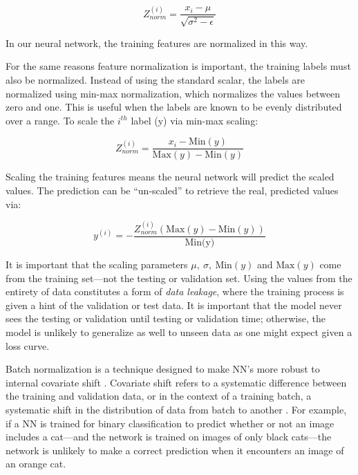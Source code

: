 \begin{equation}
    \label{z-score}
    Z_{norm}^{(i)} = \dfrac{x_i-\mu}{\sqrt{\sigma^2-\epsilon}}
\end{equation}

\noindent In our neural network, the training features are normalized in this way. 

For the same reasons feature normalization is important, the training labels must also be normalized. Instead of using the standard scalar, the labels are normalized using min-max normalization, which normalizes the values between zero and one. This is useful when the labels are known to be evenly distributed over a range. To scale the $ i^{th} $ label (y) via min-max scaling:

\begin{equation}
    Z_{norm}^{(i)} = \dfrac{x_i - \text{Min}(y)}{\text{Max}(y) - \text{Min}(y)}
    \label{eqn:min-max-scaler}
\end{equation}

Scaling the training features means the neural network will predict the scaled values. The prediction can be ``un-scaled'' to retrieve the real, predicted values via:

\begin{equation}
    y^{(i)} = - \dfrac{Z_{norm}^{(i)}\left(\text{Max}(y) - \text{Min}(y)\right)}{\text{Min(y)}}
\end{equation}

\noindent It is important that the scaling parameters $ \mu,~\sigma,~\text{Min}(y)$ and $\text{Max}(y) $ come from the training set---not the testing or validation set. Using the values from the entirety of data constitutes a form of \textit{data leakage}, where the training process is given a hint of the validation or test data. It is important that the model never sees the testing or validation until testing or validation time; otherwise, the model is unlikely to generalize as well to unseen data as one might expect given a loss curve.

Batch normalization is a technique designed to make NN's more robust to internal covariate shift \cite{batch-norm-orig}. Covariate shift refers to a systematic difference between the training and validation data, or in the context of a training batch, a systematic shift in the distribution of data from batch to another \cite{batch-norm-conference}. For example, if a NN is trained for binary classification to predict whether or not an image includes a cat---and the network is trained on images of only black cats---the network is unlikely to make a correct prediction when it encounters an image of an orange cat.

